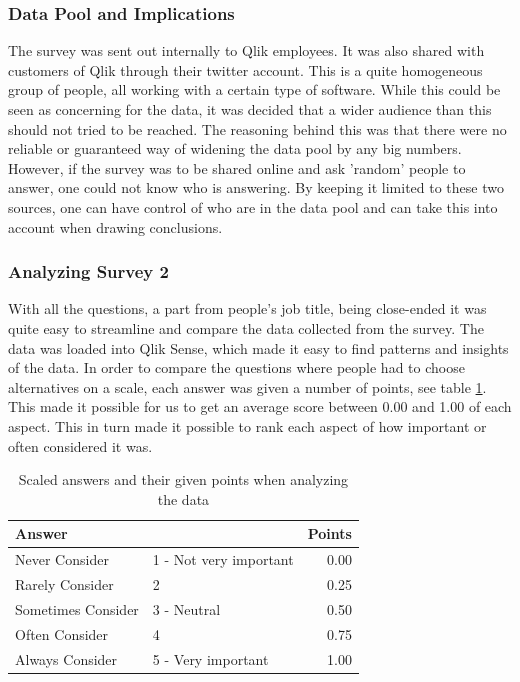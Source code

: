 \documentclass{cslthse-msc}
\begin{document}
    \subsubsection{Data Pool and Implications}
    The survey was sent out internally to Qlik employees. It was also shared with customers of Qlik through their twitter account. This is a quite homogeneous group of people, all working with a certain type of software. While this could be seen as concerning for the data, it was decided that a wider audience than this should not tried to be reached. The reasoning behind this was that there were no reliable or guaranteed way of widening the data pool by any big numbers. However, if the survey was to be shared online and ask 'random' people to answer, one could not know who is answering. By keeping it limited to these two sources, one can have control of who are in the data pool and can take this into account when drawing conclusions.

    \subsubsection{Analyzing Survey 2}
    With all the questions, a part from people's job title, being close-ended it was quite easy to streamline and compare the data collected from the survey. The data was loaded into Qlik Sense, which made it easy to find patterns and insights of the data. In order to compare the questions where people had to choose alternatives on a scale, each answer was given a number of points, see table \ref{tabl:points}.
    This made it possible for us to get an average score between 0.00 and 1.00 of each aspect. This in turn made it possible to rank each aspect of how important or often considered it was.
    \begin{table}[H]
        \caption{Scaled answers and their given points when analyzing the data}
        \label{tabl:points}
        \centering
        \begin{tabular}{l l|r}
            \multicolumn{2}{l}{\textbf{Answer}} & \textbf{Points} \\ \hline
            Never Consider & 1 - Not very important & 0.00  \\ \hline
            Rarely Consider & 2 & 0.25 \\ \hline
            Sometimes Consider & 3 - Neutral & 0.50 \\ \hline
            Often Consider & 4 & 0.75 \\ \hline
            Always Consider & 5 - Very important & 1.00 \\ \hline
        \end{tabular}
    \end{table}
\end{document}
